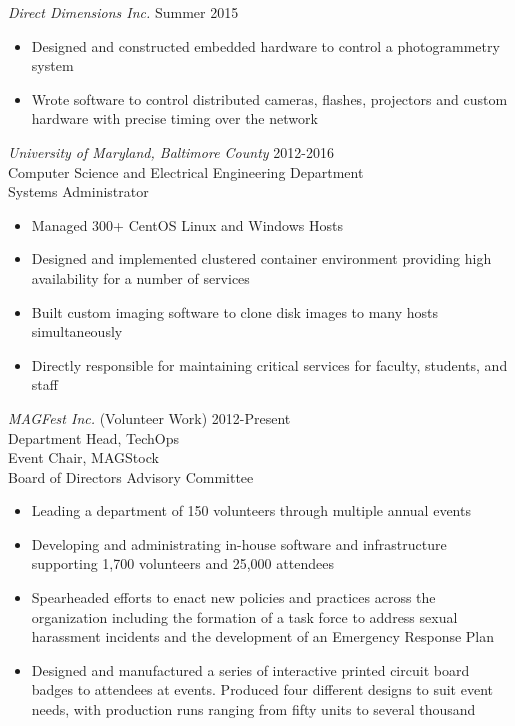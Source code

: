 \documentclass[line]{resume}
\begin{document}
\begin{resume}
\begin{itemize}
    \end{itemize}
  {\sl Direct Dimensions Inc.} \hfill Summer 2015
    \begin{itemize}
      \item Designed and constructed embedded hardware to control a photogrammetry system
      \item Wrote software to control distributed cameras, flashes, projectors and custom hardware with precise timing over the network
    \end{itemize}
  {\sl University of Maryland, Baltimore County} \hfill 2012-2016 \\
    Computer Science and Electrical Engineering Department \\
    Systems Administrator
    \begin{itemize}
      \item Managed 300+ CentOS Linux and Windows Hosts
      \item Designed and implemented clustered container environment providing high availability for a number of services
      \item Built custom imaging software to clone disk images to many hosts simultaneously
      \item Directly responsible for maintaining critical services for faculty, students, and staff
      \end{itemize}
  {\sl MAGFest Inc.} (Volunteer Work) \hfill 2012-Present \\
    Department Head, TechOps \\
    Event Chair, MAGStock \\
    Board of Directors Advisory Committee
    \begin{itemize}
      \item Leading a department of 150 volunteers through multiple annual events
      \item Developing and administrating in-house software and infrastructure supporting 1,700 volunteers and 25,000 attendees
      \item Spearheaded efforts to enact new policies and practices across the organization including the formation of a task force to address sexual harassment incidents and the development of an Emergency Response Plan
      \item Designed and manufactured a series of interactive printed circuit board badges to attendees at events. Produced four different designs to suit event needs, with production runs ranging from fifty units to several thousand
    \end{itemize}
    

\end{resume}
\end{document}
